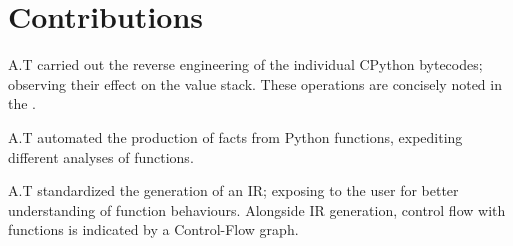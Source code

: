     \section{Contributions}
    \par A.T carried out the reverse engineering of the individual CPython bytecodes; observing their effect on the value stack. These operations are concisely noted
    in the .
    \par A.T automated the production of facts from Python functions, expediting different analyses of functions.
    \par A.T standardized the generation of an IR; exposing to the user for better understanding of function behaviours. Alongside IR generation, control flow with functions
    is indicated by a Control-Flow graph. 




